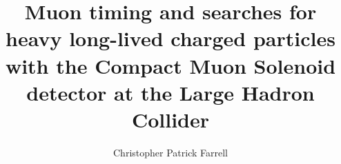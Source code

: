 \documentclass [PhD] {uclathes}
\title          {Muon timing and searches for heavy
                long-lived charged particles with the
                Compact Muon Solenoid detector at the
                Large Hadron Collider}
\author         {Christopher Patrick Farrell}
\begin{document}
%
\makeintropages

%












%

\newpage

%

\end{document}
